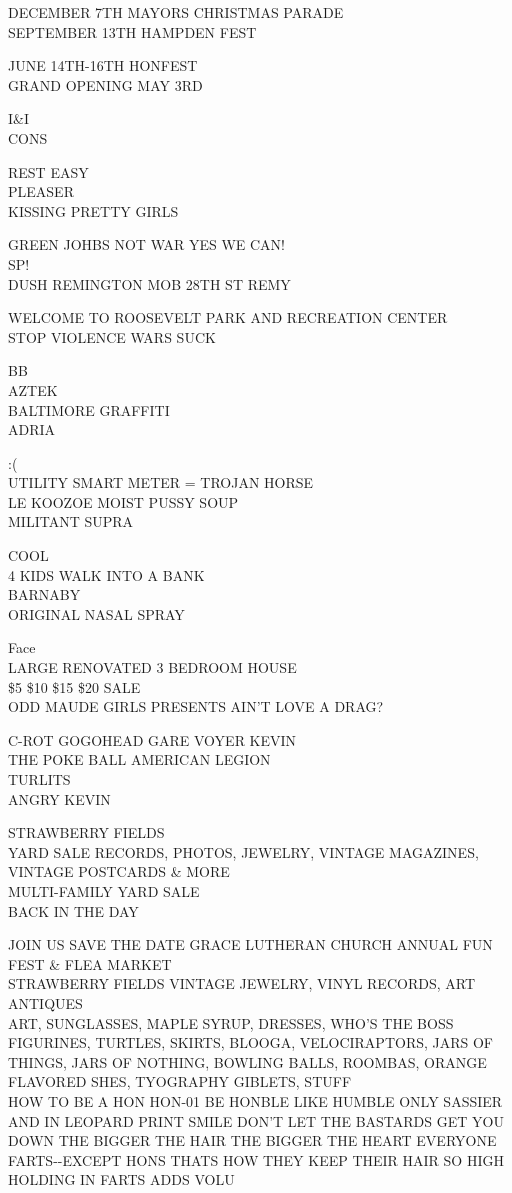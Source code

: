 \documentclass[10pt,letterpaper]{article}
\begin{document}
DECEMBER 7TH MAYORS CHRISTMAS PARADE\\
SEPTEMBER 13TH HAMPDEN FEST

JUNE 14TH{-}16TH HONFEST\\
GRAND OPENING MAY 3RD

I\&I\\
CONS

REST EASY\\
PLEASER\\
KISSING PRETTY GIRLS

GREEN JOHBS NOT WAR YES WE CAN!\\
SP!\\
DUSH REMINGTON MOB 28TH ST REMY

WELCOME TO ROOSEVELT PARK AND RECREATION CENTER\\
STOP VIOLENCE WARS SUCK

BB\\
AZTEK\\
BALTIMORE GRAFFITI\\
ADRIA

:(\\
UTILITY SMART METER = TROJAN HORSE\\
LE KOOZOE MOIST PUSSY SOUP\\
MILITANT SUPRA

COOL\\
4 KIDS WALK INTO A BANK\\
BARNABY\\
ORIGINAL NASAL SPRAY

Face\\
LARGE RENOVATED 3 BEDROOM HOUSE\\
\$5 \$10 \$15 \$20 SALE\\
ODD MAUDE GIRLS PRESENTS AIN'T LOVE A DRAG?

C{-}ROT GOGOHEAD GARE VOYER KEVIN\\
THE POKE BALL AMERICAN LEGION\\
TURLITS\\
ANGRY KEVIN

STRAWBERRY FIELDS\\
YARD SALE RECORDS, PHOTOS, JEWELRY, VINTAGE MAGAZINES, VINTAGE POSTCARDS \& MORE\\
MULTI{-}FAMILY YARD SALE\\
BACK IN THE DAY

JOIN US SAVE THE DATE GRACE LUTHERAN CHURCH ANNUAL FUN FEST \& FLEA MARKET\\
STRAWBERRY FIELDS VINTAGE JEWELRY, VINYL RECORDS, ART ANTIQUES\\
ART, SUNGLASSES, MAPLE SYRUP, DRESSES, WHO'S THE BOSS FIGURINES, TURTLES, SKIRTS, BLOOGA, VELOCIRAPTORS, JARS OF THINGS, JARS OF NOTHING, BOWLING BALLS, ROOMBAS, ORANGE FLAVORED SHES, TYOGRAPHY GIBLETS, STUFF\\
HOW TO BE A HON HON{-}01 BE HONBLE LIKE HUMBLE ONLY SASSIER AND IN LEOPARD PRINT SMILE DON'T LET THE BASTARDS GET YOU DOWN THE BIGGER THE HAIR THE BIGGER THE HEART EVERYONE FARTS{-}{-}EXCEPT HONS THATS HOW THEY KEEP THEIR HAIR SO HIGH HOLDING IN FARTS ADDS VOLU
\end{document}
